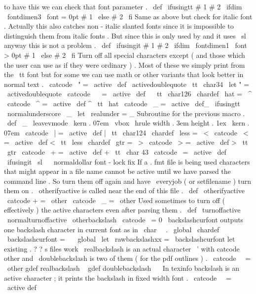 {{to
have
this
we
can
check
that
font
parameter
.
%
\
def
\
ifusingtt
#
1
#
2
{
\
ifdim
\
fontdimen3
\
font
=
0pt
#
1
\
else
#
2
\
fi
}
%
Same
as
above
but
check
for
italic
font
.
Actually
this
also
catches
%
non
-
italic
slanted
fonts
since
it
is
impossible
to
distinguish
them
from
%
italic
fonts
.
But
since
this
is
only
used
by
and
it
uses
\
sl
anyway
%
this
is
not
a
problem
.
\
def
\
ifusingit
#
1
#
2
{
\
ifdim
\
fontdimen1
\
font
>
0pt
#
1
\
else
#
2
\
fi
}
%
Turn
off
all
special
characters
except
%
(
and
those
which
the
user
can
use
as
if
they
were
ordinary
)
.
%
Most
of
these
we
simply
print
from
the
\
tt
font
but
for
some
we
can
%
use
math
or
other
variants
that
look
better
in
normal
text
.
\
catcode
\
"
=
\
active
\
def
\
activedoublequote
{
{
\
tt
\
char34
}
}
\
let
"
=
\
activedoublequote
\
catcode
\
~
=
\
active
\
def
~
{
{
\
tt
\
char126
}
}
\
chardef
\
hat
=
\
^
\
catcode
\
^
=
\
active
\
def
^
{
{
\
tt
\
hat
}
}
\
catcode
\
_
=
\
active
\
def_
{
\
ifusingtt
\
normalunderscore
\
_
}
\
let
\
realunder
=
_
%
Subroutine
for
the
previous
macro
.
\
def
\
_
{
\
leavevmode
\
kern
.
07em
\
vbox
{
\
hrule
width
.
3em
height
.
1ex
}
\
kern
.
07em
}
\
catcode
\
|
=
\
active
\
def
|
{
{
\
tt
\
char124
}
}
\
chardef
\
less
=
\
<
\
catcode
\
<
=
\
active
\
def
<
{
{
\
tt
\
less
}
}
\
chardef
\
gtr
=
\
>
\
catcode
\
>
=
\
active
\
def
>
{
{
\
tt
\
gtr
}
}
\
catcode
\
+
=
\
active
\
def
+
{
{
\
tt
\
char
43
}
}
\
catcode
\
=
\
active
\
def
{
\
ifusingit
{
{
\
sl
\
}
}
\
normaldollar
}
%
font
-
lock
fix
%
If
a
.
fmt
file
is
being
used
characters
that
might
appear
in
a
file
%
name
cannot
be
active
until
we
have
parsed
the
command
line
.
%
So
turn
them
off
again
and
have
\
everyjob
(
or
setfilename
)
turn
them
on
.
%
\
otherifyactive
is
called
near
the
end
of
this
file
.
\
def
\
otherifyactive
{
\
catcode
+
=
\
other
\
catcode
\
_
=
\
other
}
%
Used
sometimes
to
turn
off
(
effectively
)
the
active
characters
even
after
%
parsing
them
.
\
def
\
turnoffactive
{
%
\
normalturnoffactive
\
otherbackslash
}
\
catcode
\
=
0
%
\
backslashcurfont
outputs
one
backslash
character
in
current
font
%
as
in
\
char
\
\
.
\
global
\
chardef
\
backslashcurfont
=
\
\
\
global
\
let
\
rawbackslashxx
=
\
backslashcurfont
%
let
existing
.
?
?
s
files
work
%
\
realbackslash
is
an
actual
character
\
'
with
catcode
other
and
%
\
doublebackslash
is
two
of
them
(
for
the
pdf
outlines
)
.
{
\
catcode
\
\
=
\
other
gdef
realbackslash
{
\
}
gdef
doublebackslash
{
\
\
}
}
%
In
texinfo
backslash
is
an
active
character
;
it
prints
the
backslash
%
in
fixed
width
font
.
\
catcode
\
\
=
\
active
def
}}

